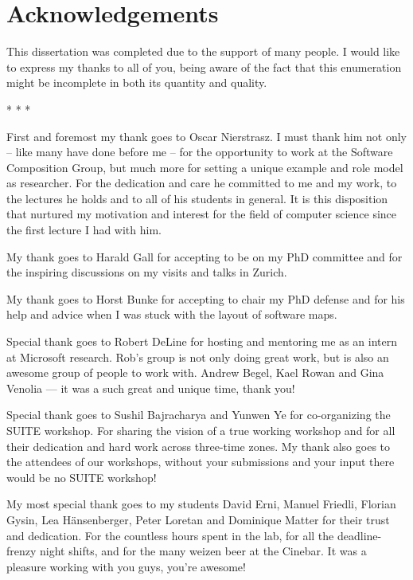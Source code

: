 \chapter*{Acknowledgements}

This dissertation was completed due to the support of many people.
I would like to express my thanks to all of you, being aware of the fact that this enumeration might be incomplete in both its quantity and quality.

\begin{center}* * *\end{center}

First and foremost my thank goes to Oscar Nierstrasz. 
%
I must thank him not only -- like many have done before me -- for the opportunity to work at the Software Composition Group, but much more for setting a unique example and role model as researcher. For the dedication and care he committed to me and my 
work, to the lectures he holds and to all of his students in general. It is this disposition that 
nurtured my motivation and interest for the field of computer science since the first lecture 
I had with him. 

My thank goes to Harald Gall for accepting to be on my PhD committee and for the inspiring discussions on my visits and talks in Zurich. 

My thank goes to Horst Bunke for accepting to chair my PhD defense and for his help and advice when I was stuck with the layout of software maps.

Special thank goes to Robert DeLine for hosting and mentoring me as an intern at Microsoft research. Rob's group is not only doing great work, but is also an awesome group of people to work with. Andrew Begel, Kael Rowan and Gina Venolia --- it was a such great and unique time, thank you!

Special thank goes to Sushil Bajracharya and Yunwen Ye for co-organizing the SUITE workshop. For sharing the vision of a true working workshop and for all their dedication and hard work across three-time zones. My thank also goes to the attendees of our workshops, without your submissions and your input there would be no SUITE workshop!

My most special thank goes to my students David Erni, Manuel Friedli, Florian Gysin, Lea H\"ansenberger, Peter Loretan and Dominique Matter for their trust and dedication. For the countless hours spent in the lab, for all the deadline-frenzy night shifts, and for the many weizen beer at the Cinebar. It was a pleasure working with you guys, you're awesome!

